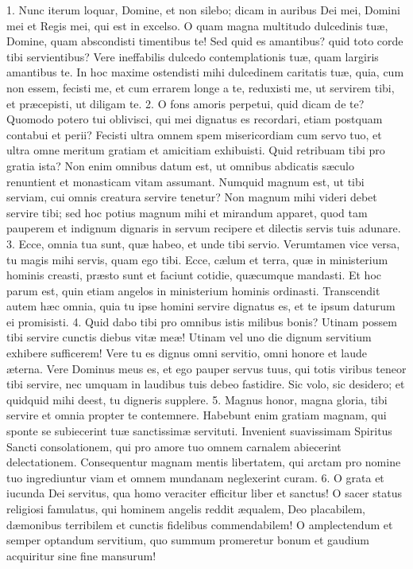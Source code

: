 \documentclass[twoside]{article}
\begin{document}
1. Nunc iterum loquar, Domine, et non silebo; dicam in auribus Dei mei, Domini mei et Regis mei, qui est in excelso. O quam magna multitudo dulcedinis tuæ, Domine, quam abscondisti timentibus te! Sed quid es amantibus? quid toto corde tibi servientibus? Vere ineffabilis dulcedo contemplationis tuæ, quam largiris amantibus te. In hoc maxime ostendisti mihi dulcedinem caritatis tuæ, quia, cum non essem, fecisti me, et cum errarem longe a te, reduxisti me, ut servirem tibi, et præcepisti, ut diligam te.
2. O fons amoris perpetui, quid dicam de te? Quomodo potero tui oblivisci, qui mei dignatus es recordari, etiam postquam contabui et perii? Fecisti ultra omnem spem misericordiam cum servo tuo, et ultra omne meritum gratiam et amicitiam exhibuisti. Quid retribuam tibi pro gratia ista? Non enim omnibus datum est, ut omnibus abdicatis sæculo renuntient et monasticam vitam assumant. Numquid magnum est, ut tibi serviam, cui omnis creatura servire tenetur? Non magnum mihi videri debet servire tibi; sed hoc potius magnum mihi et mirandum apparet, quod tam pauperem et indignum dignaris in servum recipere et dilectis servis tuis adunare.
3. Ecce, omnia tua sunt, quæ habeo, et unde tibi servio. Verumtamen vice versa, tu magis mihi servis, quam ego tibi. Ecce, cælum et terra, quæ in ministerium hominis creasti, præsto sunt et faciunt cotidie, quæcumque mandasti. Et hoc parum est, quin etiam angelos in ministerium hominis ordinasti. Transcendit autem hæc omnia, quia tu ipse homini servire dignatus es, et te ipsum daturum ei promisisti.
4. Quid dabo tibi pro omnibus istis milibus bonis? Utinam possem tibi servire cunctis diebus vitæ meæ! Utinam vel uno die dignum servitium exhibere sufficerem! Vere tu es dignus omni servitio, omni honore et laude æterna. Vere Dominus meus es, et ego pauper servus tuus, qui totis viribus teneor tibi servire, nec umquam in laudibus tuis debeo fastidire. Sic volo, sic desidero; et quidquid mihi deest, tu digneris supplere.
5. Magnus honor, magna gloria, tibi servire et omnia propter te contemnere. Habebunt enim gratiam magnam, qui sponte se subiecerint tuæ sanctissimæ servituti. Invenient suavissimam Spiritus Sancti consolationem, qui pro amore tuo omnem carnalem abiecerint delectationem. Consequentur magnam mentis libertatem, qui arctam pro nomine tuo ingrediuntur viam et omnem mundanam neglexerint curam.
6. O grata et iucunda Dei servitus, qua homo veraciter efficitur liber et sanctus! O sacer status religiosi famulatus, qui hominem angelis reddit æqualem, Deo placabilem, dæmonibus terribilem et cunctis fidelibus commendabilem! O amplectendum et semper optandum servitium, quo summum promeretur bonum et gaudium acquiritur sine fine mansurum!
\end{document}
